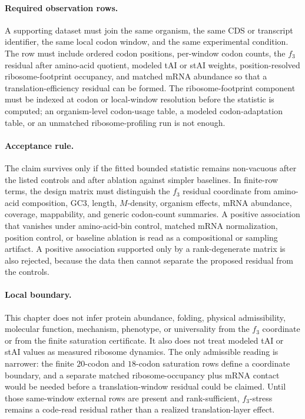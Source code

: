 \paragraph{Required observation rows.}
A supporting dataset must join the same organism, the same CDS or transcript identifier, the same local codon window, and the same experimental condition.  The row must include ordered codon positions, per-window codon counts, the $f_3$ residual after amino-acid quotient, modeled tAI or stAI weights, position-resolved ribosome-footprint occupancy, and matched mRNA abundance so that a translation-efficiency residual can be formed.  The ribosome-footprint component must be indexed at codon or local-window resolution before the statistic is computed; an organism-level codon-usage table, a modeled codon-adaptation table, or an unmatched ribosome-profiling run is not enough.

\paragraph{Acceptance rule.}
The claim survives only if the fitted bounded statistic remains non-vacuous after the listed controls and after ablation against simpler baselines.  In finite-row terms, the design matrix must distinguish the $f_3$ residual coordinate from amino-acid composition, GC3, length, $M$-density, organism effects, mRNA abundance, coverage, mappability, and generic codon-count summaries.  A positive association that vanishes under amino-acid-bin control, matched mRNA normalization, position control, or baseline ablation is read as a compositional or sampling artifact.  A positive association supported only by a rank-degenerate matrix is also rejected, because the data then cannot separate the proposed residual from the controls.

\paragraph{Local boundary.}
This chapter does not infer protein abundance, folding, physical admissibility, molecular function, mechanism, phenotype, or universality from the $f_3$ coordinate or from the finite saturation certificate.  It also does not treat modeled tAI or stAI values as measured ribosome dynamics.  The only admissible reading is narrower: the finite $20$-codon and $18$-codon saturation rows define a coordinate boundary, and a separate matched ribosome-occupancy plus mRNA contact would be needed before a translation-window residual could be claimed.  Until those same-window external rows are present and rank-sufficient, $f_3$-stress remains a code-read residual rather than a realized translation-layer effect.
